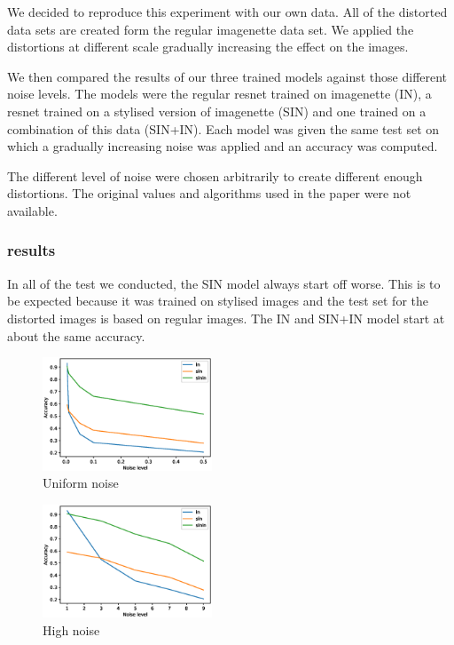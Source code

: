 \documentclass{article}
\begin{document}
We decided to reproduce this experiment with our own data.
All of the distorted data sets are created form the regular imagenette data set. We applied the distortions at different scale gradually increasing the effect on the images.

We then compared the results of our three trained models against those different noise levels.
The models were the regular resnet trained on imagenette (IN), a resnet trained on a stylised version of imagenette (SIN) and one trained on a combination of this data (SIN+IN).
Each model was given the same test set on which a gradually increasing noise was applied and an accuracy was computed.

The different level of noise were chosen arbitrarily to create different enough distortions. The original values and algorithms used in the paper were not available.

\subsubsection{results}

In all of the test we conducted, the SIN model always start off worse. This is to be expected because it was trained on stylised images and the test set for the distorted images is based on regular images. The IN and SIN+IN model start at about the same accuracy.

\begin{figure}[h!]
\centering
\includegraphics[width = 0.45\textwidth]{imgs/uniform}
\caption{Uniform noise}
\end{figure}

\begin{figure}[h!]
\centering
\includegraphics[width = 0.45\textwidth]{imgs/high_pass}
\caption{High noise}
\end{figure}
\end{document}
